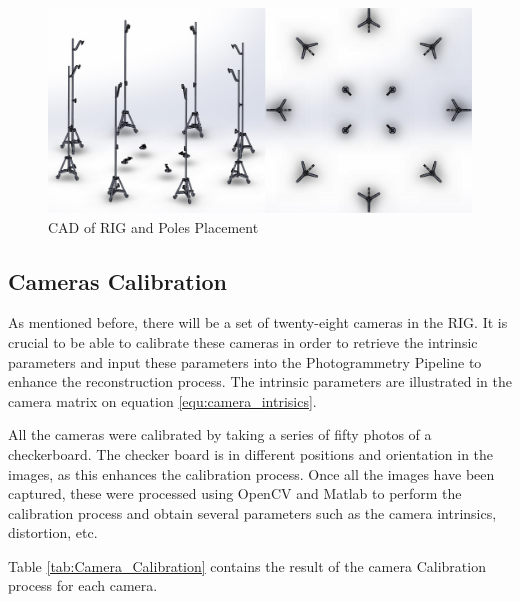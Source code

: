 \documentclass[12pt]{report}
\begin{document}
\begin{figure}[H]%
  \centering
  \includegraphics[width=1\textwidth]{cad.png}
 \caption{CAD of RIG and Poles Placement}
 \label{fig:cad} 
\end{figure}


\subsection{Cameras Calibration}
As mentioned before, there will be a set of twenty-eight cameras in the RIG. 
It is crucial to be able to calibrate these cameras in order to retrieve the intrinsic parameters and input these parameters into the Photogrammetry Pipeline to enhance
the reconstruction process. The intrinsic parameters are illustrated in the camera matrix on equation \ref{equ:camera_intrisics}.

All the cameras were calibrated by taking a series of fifty photos of a checkerboard. The checker board is in different positions and orientation in the images, as this enhances the calibration process.
Once all the images have been captured, these were processed using OpenCV and Matlab to perform the calibration process and obtain several parameters such as the camera intrinsics, distortion, etc.

Table \ref{tab:Camera_Calibration} contains the result of the camera Calibration process for each camera.
\end{document}
